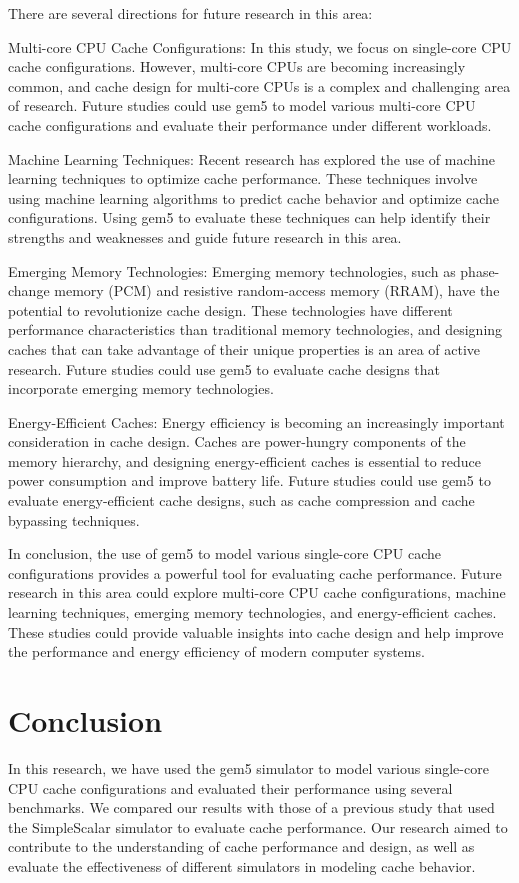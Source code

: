 \documentclass[conference]{IEEEtran}
\begin{document}
There are several directions for future research in this area:

Multi-core CPU Cache Configurations: In this study, we focus on single-core CPU cache configurations. However, multi-core CPUs are becoming increasingly common, and cache design for multi-core CPUs is a complex and challenging area of research. Future studies could use gem5 to model various multi-core CPU cache configurations and evaluate their performance under different workloads.

Machine Learning Techniques: Recent research has explored the use of machine learning techniques to optimize cache performance. These techniques involve using machine learning algorithms to predict cache behavior and optimize cache configurations. Using gem5 to evaluate these techniques can help identify their strengths and weaknesses and guide future research in this area.

Emerging Memory Technologies: Emerging memory technologies, such as phase-change memory (PCM) and resistive random-access memory (RRAM), have the potential to revolutionize cache design. These technologies have different performance characteristics than traditional memory technologies, and designing caches that can take advantage of their unique properties is an area of active research. Future studies could use gem5 to evaluate cache designs that incorporate emerging memory technologies.

Energy-Efficient Caches: Energy efficiency is becoming an increasingly important consideration in cache design. Caches are power-hungry components of the memory hierarchy, and designing energy-efficient caches is essential to reduce power consumption and improve battery life. Future studies could use gem5 to evaluate energy-efficient cache designs, such as cache compression and cache bypassing techniques.

In conclusion, the use of gem5 to model various single-core CPU cache configurations provides a powerful tool for evaluating cache performance. Future research in this area could explore multi-core CPU cache configurations, machine learning techniques, emerging memory technologies, and energy-efficient caches. These studies could provide valuable insights into cache design and help improve the performance and energy efficiency of modern computer systems.

\section{Conclusion}
In this research, we have used the gem5 simulator to model various single-core CPU cache configurations and evaluated their performance using several benchmarks. We compared our results with those of a previous study that used the SimpleScalar simulator to evaluate cache performance. Our research aimed to contribute to the understanding of cache performance and design, as well as evaluate the effectiveness of different simulators in modeling cache behavior.
\end{document}
